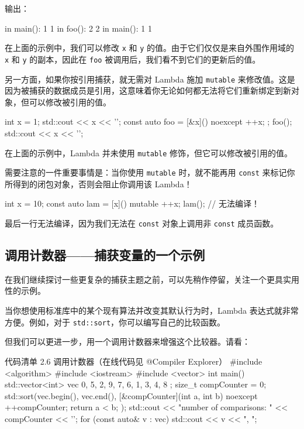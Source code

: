 \begin{codebox}
输出：

\begin{codebox}
in main(): 1 1
in foo(): 2 2
in main(): 1 1
\end{codebox}

在上面的示例中，我们可以修改 \texttt{x} 和 \texttt{y} 的值。由于它们仅仅是来自外围作用域的 \texttt{x} 和 \texttt{y} 的副本，因此在 \texttt{foo} 被调用后，我们看不到它们的更新后的值。

另一方面，如果你按引用捕获，就无需对 Lambda 施加 \texttt{mutable} 来修改值。这是因为被捕获的数据成员是引用，这意味着你无论如何都无法将它们重新绑定到新对象，但可以修改被引用的值。

\begin{codebox}
int x = 1;
std::cout << x << '\n';
const auto foo = [&x]() noexcept { ++x; };
foo();
std::cout << x << '\n';
\end{codebox}

在上面的示例中，Lambda 并未使用 \texttt{mutable} 修饰，但它可以修改被引用的值。

需要注意的一件重要事情是：当你使用 \texttt{mutable} 时，就不能再用 \texttt{const} 来标记你所得到的闭包对象，否则会阻止你调用该 Lambda！

\begin{codebox}
int x = 10;
const auto lam = [x]() mutable { ++x; }
lam(); // 无法编译！
\end{codebox}

最后一行无法编译，因为我们无法在 \texttt{const} 对象上调用非 \texttt{const} 成员函数。

\subsection{调用计数器——捕获变量的一个示例}

在我们继续探讨一些更复杂的捕获主题之前，可以先稍作停留，关注一个更具实用性的示例。

当你想使用标准库中的某个现有算法并改变其默认行为时，Lambda 表达式就非常方便。例如，对于 \texttt{std::sort}，你可以编写自己的比较函数。

但我们可以更进一步，用一个调用计数器来增强这个比较器。请看：

\begin{codeboxt}{代码清单 2.6 调用计数器（在线代码见 @Compiler Explorer）}
#include <algorithm>
#include <iostream>
#include <vector>
int main() {
std::vector<int> vec { 0, 5, 2, 9, 7, 6, 1, 3, 4, 8 };
size_t compCounter = 0;
std::sort(vec.begin(), vec.end(),
[&compCounter](int a, int b) noexcept {
++compCounter;
return a < b;
}
);
std::cout << "number of comparisons: " << compCounter << '\n';
for (const auto& v : vec)
std::cout << v << ", ";
}
\end{codeboxt}


\end{codebox}
